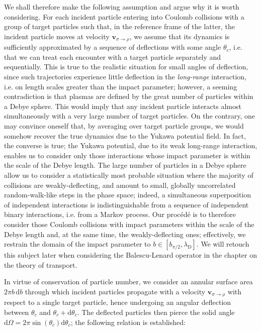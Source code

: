 \vspace*{2.5pt}

\quad We shall therefore make the following assumption and argue why it is worth considering. For each incident particle entering into Coulomb collisions with a group of target particles such that, in the reference frame of the latter, the incident particle moves at velocity $\mathbf{v}_{\sigma\to\rho}$, we assume that its dynamics is sufficiently approximated by a sequence of deflections with some angle $\theta_c$, i.e. that we can treat each encounter with a target particle separately and sequentially. This is true to the realistic situation for small angles of deflection, since such trajectories experience little deflection  in the \textit{long-range} interaction, i.e. on length scales greater than the impact parameter; however, a seeming contradiction is that plasmas are defined by the great number of particles within a Debye sphere. This would imply that any incident particle interacts almost simultaneously with a very large number of target particles. On the contrary, one may convince oneself that, by averaging over target particle groups, we would somehow recover the true dynamics due to the Yukawa potential field. In fact, the converse is true; the Yukawa potential, due to its weak long-range interaction, enables us to consider only those interactions whose impact parameter is within the scale of the Debye length. The large number of particles in a Debye sphere allow us to consider a statistically most probable situation where the majority of collisions are weakly-deflecting, and amount to small, globally uncorrelated random-walk-like steps in the phase space; indeed, a simultaneous superposition of independent interactions is indistinguishable from a sequence of independent binary interactions, i.e. from a Markov process. Our procédé is to therefore consider those Coulomb collisions with impact parameters within the scale of the Debye length and, at the same time, the weakly-deflecting ones; effectively, we restrain the domain of the impact parameter to $b\in[b_{\pi/2},\lambda_{\mathrm{D}}]$. We will retouch this subject later when considering the Balescu-Lenard operator in the chapter on the theory of transport.

\vspace*{2.5pt}

\quad In virtue of conservation of particle number, we consider an annular surface area $2\pi b\,\mathrm{d}b$ through which incident particles propagate with a velocity $\mathbf{v}_{\sigma\to\rho}$ with respect to a single target particle, hence undergoing an angular deflection between $\theta_c$ and $\theta_c+\mathrm{d}\theta_c$. The deflected particles then pierce the solid angle $\mathrm{d}\Omega=2\pi\sin(\theta_c)\mathrm{d}\theta_c$; the following relation is established:

